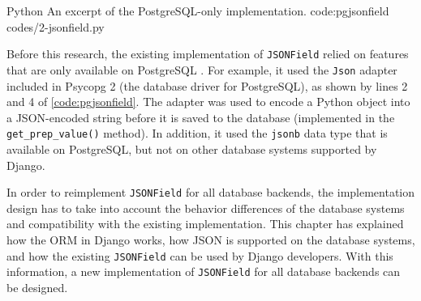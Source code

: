 \listing
{Python}
{An excerpt of the PostgreSQL-only  implementation.}
{code:pgjsonfield}
{codes/2-jsonfield.py}

Before this research, the existing implementation of \verb|JSONField| relied on
features that are only available on PostgreSQL \cite{django:pgjsonfield}. For
example, it used the \verb|Json| adapter included in Psycopg 2 (the database
driver for PostgreSQL), as shown by lines 2 and 4 of
\autoref{code:pgjsonfield}. The adapter was used to encode a Python object into
a JSON-encoded string before it is saved to the database (implemented in the
\verb|get_prep_value()| method). In addition, it used the \verb|jsonb| data
type that is available on PostgreSQL, but not on other database systems
supported by Django.

In order to reimplement \verb|JSONField| for all database backends, the
implementation design has to take into account the behavior differences of the
database systems and compatibility with the existing implementation.
This chapter has explained how the ORM in Django works, how JSON is supported
on the database systems, and how the existing \verb|JSONField| can be used by
Django developers. With this information, a new implementation of
\verb|JSONField| for all database backends can be designed.
